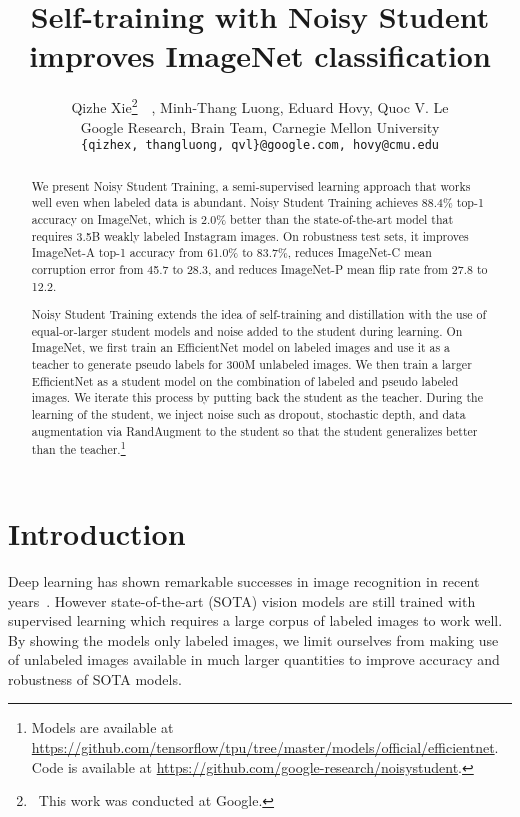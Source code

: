 \documentclass[10pt,twocolumn,letterpaper]{article}
\begin{document}
\title{Self-training with Noisy Student improves ImageNet classification}


\author{Qizhe Xie\thanks{~This work was conducted at Google.}~~, Minh-Thang Luong, Eduard Hovy, Quoc V. Le\\
Google Research, Brain Team, Carnegie Mellon University\\
{\tt\small \{qizhex, thangluong, qvl\}@google.com, hovy@cmu.edu}
}

\maketitle


\begin{abstract}
We present Noisy Student Training, a semi-supervised learning approach that works well even when labeled data is abundant.
Noisy Student Training  achieves 88.4\% top-1 accuracy on ImageNet, which is 2.0\% better than the state-of-the-art model that requires 3.5B weakly labeled Instagram images. On robustness test sets, it improves ImageNet-A top-1 accuracy from 61.0\% to 83.7\%, reduces ImageNet-C mean corruption error from 45.7 to 28.3, and reduces ImageNet-P mean flip rate from 27.8 to 12.2.

Noisy Student Training extends the idea of self-training and distillation with the use of equal-or-larger student models and noise added to the student during learning.
On ImageNet, we first train an EfficientNet model on labeled images and use it as a teacher to generate pseudo labels for 300M unlabeled images. We then train a larger EfficientNet as a student model on the combination of labeled and pseudo labeled images. We iterate this process by putting back the student as the teacher. During the learning of the student, we inject noise such as  dropout, stochastic depth, and data augmentation via RandAugment to the student so that the  student generalizes better than the teacher.\footnote{Models are available at \url{https://github.com/tensorflow/tpu/tree/master/models/official/efficientnet}. Code is available at \url{https://github.com/google-research/noisystudent}.}

\end{abstract}

\section{Introduction}

Deep learning has shown remarkable successes in image recognition in recent years~\cite{krizhevsky2012imagenet,szegedy2015going,simonyan2014very,he2016deep,tan2019efficientnet}. However state-of-the-art (SOTA) vision models are still trained with supervised learning which requires a large corpus of labeled images to work well. By  showing the models only labeled images, we limit ourselves from  making use of unlabeled images available in  much larger quantities to improve accuracy and robustness of SOTA models. 
\end{document}
